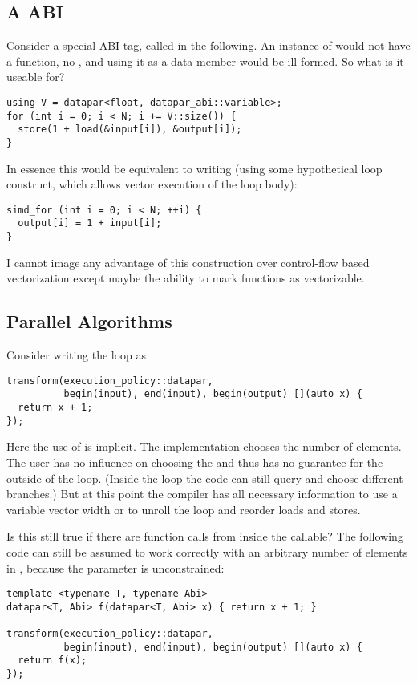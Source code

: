 \subsection{A  ABI}
Consider a special ABI tag, called  in the following.
An instance of \datapar[<T, variable>] would not have a  function, no , and using it as a data member would be ill-formed.
So what is it useable for?
\smallskip\begin{lstlisting}[style=Vc]
using V = datapar<float, datapar_abi::variable>;
for (int i = 0; i < N; i += V::size()) {
  store(1 + load(&input[i]), &output[i]);
}
\end{lstlisting}
In essence this would be equivalent to writing (using some hypothetical  loop construct, which allows vector execution of the loop body):
\smallskip\begin{lstlisting}[style=Vc]
simd_for (int i = 0; i < N; ++i) {
  output[i] = 1 + input[i];
}
\end{lstlisting}

I cannot image any advantage of this construction over control-flow based vectorization except maybe the ability to mark functions as vectorizable.

\subsection{Parallel Algorithms}
Consider writing the loop as
\smallskip\begin{lstlisting}[style=Vc]
transform(execution_policy::datapar,
          begin(input), end(input), begin(output) [](auto x) {
  return x + 1;
});
\end{lstlisting}
Here the use of \datapar is implicit.
The implementation chooses the number of elements.
The user has no influence on choosing the  and thus has no guarantee for the  outside of the loop.
(Inside the loop the code can still query  and choose different branches.)
But at this point the compiler has all necessary information to use a variable vector width or to unroll the loop and reorder loads and stores.

Is this still true if there are function calls from inside the callable?
The following code can still be assumed to work correctly with an arbitrary number of elements in \datapar, because the  parameter is unconstrained:
\smallskip\begin{lstlisting}[style=Vc]
template <typename T, typename Abi>
datapar<T, Abi> f(datapar<T, Abi> x) { return x + 1; }

transform(execution_policy::datapar,
          begin(input), end(input), begin(output) [](auto x) {
  return f(x);
});
\end{lstlisting}

